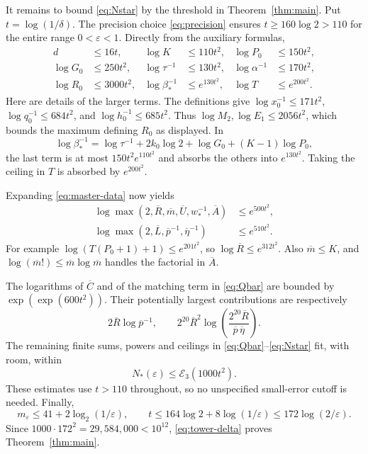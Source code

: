 \documentclass[11pt]{article}
\theoremstyle{remark}
\newcommand{\Ethree}{\mathcal E_3}
\begin{document}
It remains to bound \eqref{eq:Nstar} by the threshold in
Theorem~\ref{thm:main}. Put $t=\log(1/\delta)$. The precision choice
\eqref{eq:precision} ensures $t\ge160\log2>110$ for the entire range
$0<\varepsilon<1$. Directly from the auxiliary formulas,
\begin{align*}
 d&\le16t,&\log K&\le110t^2,&\log P_0&\le150t^2,\\
 \log G_0&\le250t^2,&\log\tau^{-1}&\le130t^2,
 &\log\alpha^{-1}&\le170t^2,\\
 \log R_0&\le3000t^2,&\log\beta_*^{-1}&\le e^{130t^2},
 &\log T&\le e^{200t^2}.
\end{align*}
Here are details of the larger terms. The definitions give
$\log x_0^{-1}\le171t^2$, $\log q_0^{-1}\le684t^2$, and
$\log h_0^{-1}\le685t^2$. Thus
$\log M_2,\log E_1\le2056t^2$, which bounds the maximum defining
$R_0$ as displayed. In
\[
 \log\beta_*^{-1}
 =\log\tau^{-1}+2k_0\log2+\log G_0+(K-1)\log P_0,
\]
the last term is at most $150t^2e^{110t^2}$ and absorbs the others into
$e^{130t^2}$. Taking the ceiling in $T$ is absorbed by $e^{200t^2}$.

Expanding \eqref{eq:master-data} now yields
\begin{align*}
 \log\max(2,\overline R,\overline m,\overline U,w_*^{-1},\overline A)
       &\le e^{500t^2},\\
 \log\max(2,\overline L,\overline p^{-1},\overline\eta^{-1})
       &\le e^{510t^2}.
\end{align*}
For example $\log(T(P_0+1)+1)\le e^{201t^2}$, so
$\log\overline R\le e^{312t^2}$. Also $\overline m\le K$, and
$\log(\overline m!)\le\overline m\log\overline m$ handles the
factorial in $\overline A$.

The logarithms of $\overline C$ and of the matching term in
\eqref{eq:Qbar} are bounded by $\exp(\exp(600t^2))$. Their potentially
largest contributions are respectively
\[
 2\overline R\log\overline p^{-1},\qquad
 2^{20}\overline R^2
       \log\left(\frac{2^{20}\overline R}
                             {\overline p\,\overline\eta}\right).
\]
The remaining finite sums, powers and ceilings in
\eqref{eq:Qbar}--\eqref{eq:Nstar} fit, with room, within
\begin{equation}\label{eq:tower-delta}
 N_*(\varepsilon)\le\Ethree(1000t^2).
\end{equation}
These estimates use $t>110$ throughout, so no unspecified small-error
cutoff is needed. Finally,
\[
 m_\varepsilon\le41+2\log_2(1/\varepsilon),\qquad
 t\le164\log2+8\log(1/\varepsilon)
       \le172\log(2/\varepsilon).
\]
Since $1000\cdot172^2=29{,}584{,}000<10^{12}$,
\eqref{eq:tower-delta} proves Theorem~\ref{thm:main}.
\end{document}
